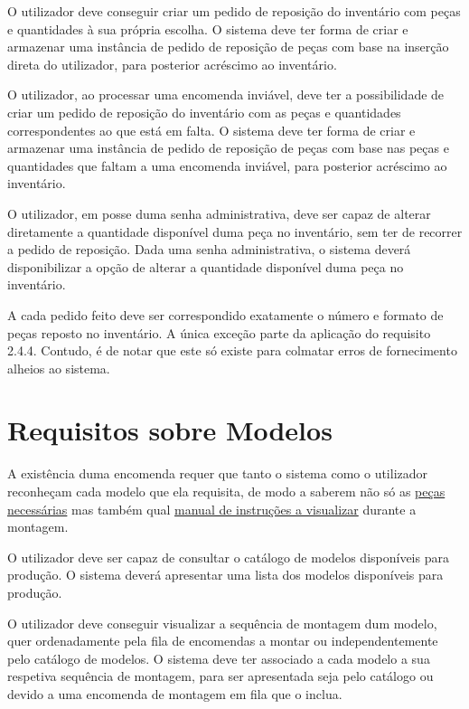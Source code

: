             {O utilizador deve conseguir criar um pedido de reposição do inventário com peças e quantidades à sua própria escolha.}
            {O sistema deve ter forma de criar e armazenar uma instância de pedido de reposição de peças com base na inserção direta do utilizador, para posterior acréscimo ao inventário.}   
            
            {O utilizador, ao processar uma encomenda inviável, deve ter a possibilidade de criar um pedido de reposição do inventário com as peças e quantidades correspondentes ao que está em falta.}
            {O sistema deve ter forma de criar e armazenar uma instância de pedido de reposição de peças com base nas peças e quantidades que faltam a uma encomenda inviável, para posterior acréscimo ao inventário.}

            {O utilizador, em posse duma senha administrativa, deve ser capaz de alterar diretamente a quantidade disponível duma peça no inventário, sem ter de recorrer a pedido de reposição.}
            {Dada uma senha administrativa, o sistema deverá disponibilizar a opção de alterar a quantidade disponível duma peça no inventário.}

            {A cada pedido feito deve ser correspondido exatamente o número e formato de peças reposto no inventário. A única exceção parte da aplicação do requisito 2.4.4. Contudo, é de notar que este só existe para colmatar erros de fornecimento alheios ao sistema.}

    \newpage
    \section{Requisitos sobre Modelos}

    A existência duma encomenda requer que tanto o sistema como o utilizador reconheçam cada modelo que ela requisita, de modo a saberem não só as \underline{peças necessárias} mas também qual \underline{manual de instruções a visualizar} durante a montagem.

            {O utilizador deve ser capaz de consultar o catálogo de modelos disponíveis para produção.}
            {O sistema deverá apresentar uma lista dos modelos disponíveis para produção.}

            {O utilizador deve conseguir visualizar a sequência de montagem dum modelo, quer ordenadamente pela fila de encomendas a montar ou independentemente pelo catálogo de modelos.}
            {O sistema deve ter associado a cada modelo a sua respetiva sequência de montagem, para ser apresentada seja pelo catálogo ou devido a uma encomenda de montagem em fila que o inclua.}

